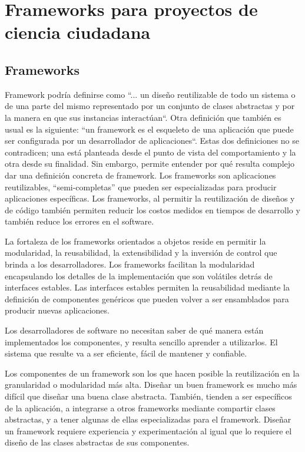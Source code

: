 \chapter{Frameworks para proyectos de ciencia ciudadana}

\section{Frameworks}

	Framework podría definirse como ``... un diseño reutilizable de todo un sistema o de una parte del mismo representado por un conjunto de clases abstractas y por la manera en que sus instancias interactúan“. Otra definición que también es usual es la siguiente: ``un framework es el esqueleto de una aplicación que puede ser configurada por un desarrollador de aplicaciones“. Estas dos definiciones no se contradicen; una está planteada desde el punto de vista del comportamiento y la otra desde su finalidad. Sin embargo, permite entender por qué resulta complejo dar una definición concreta de framework. Los frameworks son aplicaciones reutilizables, ``semi-completas'' que pueden ser especializadas para producir aplicaciones específicas. Los frameworks, al permitir la reutilización de diseños y de código también permiten reducir los costos medidos en tiempos de desarrollo y también reduce los errores en el software. 
	
	La fortaleza de los frameworks orientados a objetos reside en permitir la modularidad, la reusabilidad, la extensibilidad y la inversión de control que brinda a los desarrolladores. Los frameworks facilitan la modularidad encapsulando los detalles de la implementación que son volátiles detrás de interfaces estables. Las interfaces estables permiten la reusabilidad mediante la definición de componentes genéricos que pueden volver a ser ensamblados para producir nuevas aplicaciones. \cite{fayad1997object}
	
    Los desarrolladores de software no necesitan saber de qué manera están implementados los componentes, y resulta sencillo aprender a utilizarlos. El sistema que resulte va a ser eficiente, fácil de mantener y confiable.\cite{johnson1997frameworks} \cite{fayad1997object}
	
	Los componentes de un framework son los que hacen posible la reutilización en la granularidad o modularidad más alta. Diseñar un buen framework es mucho más difícil que diseñar una buena clase abstracta. También, tienden a ser específicos de la aplicación, a integrarse a otros frameworks mediante compartir clases abstractas, y a tener algunas de ellas especializadas para el framework. Diseñar un framework requiere experiencia y experimentación al igual que lo requiere el diseño de las clases abstractas de sus componentes.\cite{johnson1988designing}

